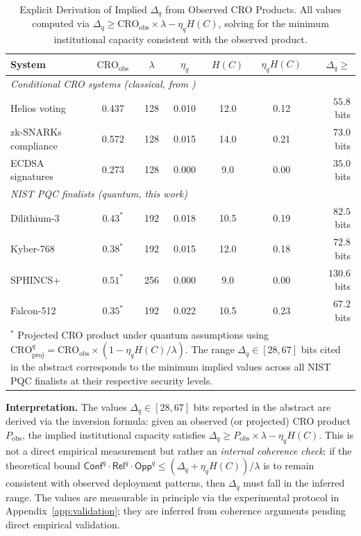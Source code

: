 \documentclass{ieeeaccess}
\newcommand{\Conf}{\mathsf{Conf}}
\newcommand{\Rel}{\mathsf{Rel}}
\newcommand{\Opp}{\mathsf{Opp}}
\begin{document}
\begin{table}[h]
\centering
\caption{Explicit Derivation of Implied $\Delta_q$ from Observed 
CRO Products. All values computed via 
$\Delta_q \geq \text{CRO}_{\text{obs}} \times \lambda 
- \eta_q H(C)$, solving for the minimum institutional capacity 
consistent with the observed product.}
\label{tab:delta_q_derivation}
\setlength{\tabcolsep}{4pt}
\small
\begin{tabular}{lcccccr}
\toprule
\textbf{System} & $\text{CRO}_{\text{obs}}$ & $\lambda$ 
  & $\eta_q$ & $H(C)$ & $\eta_q H(C)$ & $\Delta_q \geq$ \\
\midrule
\multicolumn{7}{l}{\emph{Conditional CRO systems (classical, from 
\cite{Minka2026CRO})}} \\
Helios voting 
  & 0.437 & 128 & 0.010 & 12.0 & 0.12 & $55.8$ bits \\
zk-SNARKs compliance 
  & 0.572 & 128 & 0.015 & 14.0 & 0.21 & $73.0$ bits \\
ECDSA signatures 
  & 0.273 & 128 & 0.000 & 9.0  & 0.00 & $35.0$ bits \\
\midrule
\multicolumn{7}{l}{\emph{NIST PQC finalists (quantum, this work)}} \\
Dilithium-3 
  & $0.43^*$ & 192 & 0.018 & 10.5 & 0.19 & $82.5$ bits \\
Kyber-768 
  & $0.38^*$ & 192 & 0.015 & 12.0 & 0.18 & $72.8$ bits \\
SPHINCS+ 
  & $0.51^*$ & 256 & 0.000 & 9.0  & 0.00 & $130.6$ bits \\
Falcon-512 
  & $0.35^*$ & 192 & 0.022 & 10.5 & 0.23 & $67.2$ bits \\
\bottomrule
\multicolumn{7}{p{8.5cm}}{\footnotesize $^*$ Projected CRO product 
under quantum assumptions using 
$\text{CRO}^q_{\text{proj}} = \text{CRO}_{\text{obs}} 
\times (1 - \eta_q H(C)/\lambda)$. 
The range $\Delta_q \in [28, 67]$ bits cited in the abstract 
corresponds to the minimum implied values across all NIST PQC 
finalists at their respective security levels.}
\end{tabular}
\end{table}

\noindent\textbf{Interpretation.} The values $\Delta_q \in [28, 67]$ 
bits reported in the abstract are derived via the inversion formula: 
given an observed (or projected) CRO product $P_{\text{obs}}$, 
the implied institutional capacity satisfies 
$\Delta_q \geq P_{\text{obs}} \times \lambda - \eta_q H(C)$. 
This is not a direct empirical measurement but rather an 
\emph{internal coherence check}: if the theoretical bound 
$\Conf^q \cdot \Rel^q \cdot \Opp^q \leq (\Delta_q + \eta_q H(C))/\lambda$ 
is to remain consistent with observed deployment patterns, 
then $\Delta_q$ must fall in the inferred range. 
The values are measurable in principle via the experimental 
protocol in Appendix~\ref{app:validation}; they are inferred 
from coherence arguments pending direct empirical validation.
\end{document}
